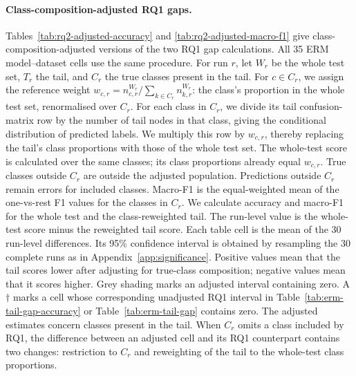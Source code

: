 \paragraph{Class-composition-adjusted RQ1 gaps.}
Tables~\ref{tab:rq2-adjusted-accuracy} and \ref{tab:rq2-adjusted-macro-f1} give class-composition-adjusted versions of the two RQ1 gap calculations. All 35 ERM model--dataset cells use the same procedure.
For run $r$, let $W_r$ be the whole test set, $T_r$ the tail, and $C_r$ the true classes present in the tail. For $c\in C_r$, we assign the reference weight $w_{c,r}=n^{W_r}_{c,r}/\sum_{k\in C_r}n^{W_r}_{k,r}$: the class's proportion in the whole test set, renormalised over $C_r$.
For each class in $C_r$, we divide its tail confusion-matrix row by the number of tail nodes in that class, giving the conditional distribution of predicted labels. We multiply this row by $w_{c,r}$, thereby replacing the tail's class proportions with those of the whole test set. The whole-test score is calculated over the same classes; its class proportions already equal $w_{c,r}$. True classes outside $C_r$ are outside the adjusted population. Predictions outside $C_r$ remain errors for included classes. Macro-F1 is the equal-weighted mean of the one-vs-rest F1 values for the classes in $C_r$.
We calculate accuracy and macro-F1 for the whole test and the class-reweighted tail. The run-level value is the whole-test score minus the reweighted tail score. Each table cell is the mean of the 30 run-level differences. Its 95\% confidence interval is obtained by resampling the 30 complete runs as in Appendix~\ref{app:significance}.
Positive values mean that the tail scores lower after adjusting for true-class composition; negative values mean that it scores higher. Grey shading marks an adjusted interval containing zero. A $\dagger$ marks a cell whose corresponding unadjusted RQ1 interval in Table~\ref{tab:erm-tail-gap-accuracy} or Table~\ref{tab:erm-tail-gap} contains zero.
The adjusted estimates concern classes present in the tail. When $C_r$ omits a class included by RQ1, the difference between an adjusted cell and its RQ1 counterpart contains two changes: restriction to $C_r$ and reweighting of the tail to the whole-test class proportions.

